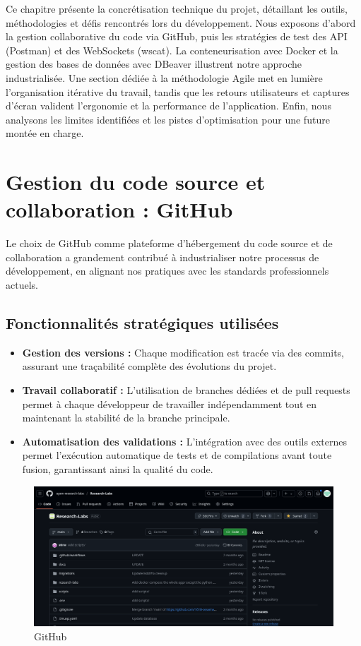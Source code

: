 \documentclass[12pt]{rapportPfe}
\begin{document}
Ce chapitre présente la concrétisation technique du projet, détaillant les outils, méthodologies et défis rencontrés lors du développement. Nous exposons d’abord la gestion collaborative du code via GitHub, puis les stratégies de test des API (Postman) et des WebSockets (wscat). La conteneurisation avec Docker et la gestion des bases de données avec DBeaver illustrent notre approche industrialisée. Une section dédiée à la méthodologie Agile met en lumière l’organisation itérative du travail, tandis que les retours utilisateurs et captures d’écran valident l’ergonomie et la performance de l’application. Enfin, nous analysons les limites identifiées et les pistes d’optimisation pour une future montée en charge.

\section{Gestion du code source et collaboration : GitHub}

Le choix de GitHub comme plateforme d’hébergement du code source et de collaboration a grandement contribué à industrialiser notre processus de développement, en alignant nos pratiques avec les standards professionnels actuels.

\subsection{Fonctionnalités stratégiques utilisées}

\begin{itemize}
    \item \textbf{Gestion des versions :} Chaque modification est tracée via des commits, assurant une traçabilité complète des évolutions du projet.
    \item \textbf{Travail collaboratif :} L’utilisation de branches dédiées et de pull requests permet à chaque développeur de travailler indépendamment tout en maintenant la stabilité de la branche principale.
    \item \textbf{Automatisation des validations :} L’intégration avec des outils externes permet l’exécution automatique de tests et de compilations avant toute fusion, garantissant ainsi la qualité du code.
\end{itemize}

\FloatBarrier
\begin{figure}[htbp]
    \centering
    \includegraphics[width=1.0\textwidth]{diagrams/ss_02.png}
    \caption{GitHub}
    \label{fig:diagram5}
\end{figure}
\end{document}
